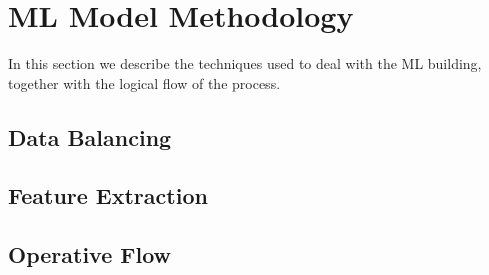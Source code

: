 \section{ML Model Methodology}
In this section we describe the techniques used to deal with the ML building, together with the logical flow of the process.

\subsection{Data Balancing}

\subsection{Feature Extraction}

\subsection{Operative Flow}
